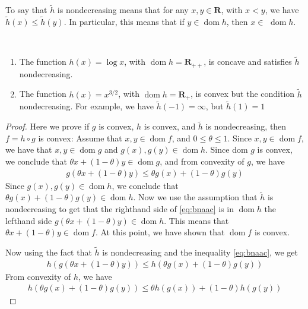 \documentclass{article}
\newcommand{\dom}{\operatorname{dom}}
\begin{document}
\begin{rema}
To say that $\tilde{h}$ is nondecreasing means that for any $x, y \in \mathbf{R}$, with $x<y$, we have $\tilde{h}(x) \leq \tilde{h}(y)$. In particular, this means that if $y \in \dom  h$, then $x \in$ $\dom  h$.
\end{rema}
\begin{exma}$\quad$
\vspace{-0.2cm}
\begin{enumerate}
    \item The function $h(x)=\log x$, with $\dom  h=\mathbf{R}_{++}$, is concave and satisfies $\tilde{h}$ nondecreasing.
    \item The function $h(x)=x^{3 / 2}$, with $\dom  h=\mathbf{R}_{+}$, is convex but  the condition $\tilde{h}$ nondecreasing. For example, we have $\tilde{h}(-1)=\infty$, but $\tilde{h}(1)=1$
\end{enumerate}
\end{exma}
\begin{proof}\color{ForestGreen}
Here we prove if $g$ is convex, $h$ is convex, and $\tilde{h}$ is nondecreasing, then $f=h \circ g$ is convex:
 Assume that $x, y \in \dom  f$, and $0 \leq \theta \leq 1$. Since $x, y \in \dom  f$, we have that $x, y \in \dom  g$ and $g(x), g(y) \in \dom  h$. Since dom $g$ is convex, we conclude that $\theta x+(1-\theta) y \in \dom  g$, and from convexity of $g$, we have
\begin{align}
g(\theta x+(1-\theta) y) \leq \theta g(x)+(1-\theta) g(y)\label{eq:bnaac}
\end{align}
Since $g(x), g(y) \in \dom  h$, we conclude that $\theta g(x)+(1-\theta) g(y) \in \dom  h$. Now we use the assumption that $\tilde{h}$ is nondecreasing to get that the righthand side of \cref{eq:bnaac} is in $\dom  h$ the lefthand side $g(\theta x+(1-\theta) y) \in \dom  h$. This means that $\theta x+(1-\theta) y \in \dom  f$. At this point, we have shown that $\dom  f$ is convex.

Now using the fact that $\tilde{h}$ is nondecreasing and the inequality \cref{eq:bnaac}, we get
\begin{align*}
h(g(\theta x+(1-\theta) y)) \leq h(\theta g(x)+(1-\theta) g(y))
\end{align*}
From convexity of $h$, we have
\begin{align*}
h(\theta g(x)+(1-\theta) g(y)) \leq \theta h(g(x))+(1-\theta) h(g(y))
\end{align*}
\end{proof}
\end{document}
